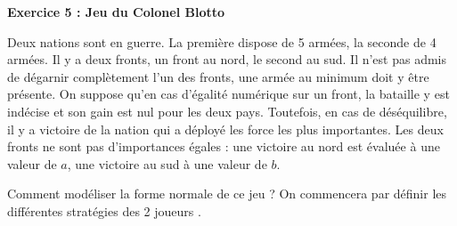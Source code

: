 \documentclass[12pt]{article}
\begin{document}
\begin{center}
\textbf{Exercice 5 : Jeu du Colonel Blotto}
\end{center}

Deux nations sont en guerre. La premi\`ere dispose de 5 arm\'ees, la seconde de 4 arm\'ees. Il y a deux fronts, un front au nord, le second au sud. 
Il n'est pas admis de d\'egarnir compl\`etement l'un des fronts, une arm\'ee au minimum doit y \^etre pr\'esente. On suppose qu'en cas d'\'egalit\'e num\'erique sur un front, 
la bataille y est ind\'ecise et son gain est nul pour les deux pays. Toutefois, en cas de d\'es\'equilibre, il y a victoire de la nation qui a d\'eploy\'e les force les plus importantes.
Les deux fronts ne sont pas d'importances \'egales : une victoire au nord est \'evalu\'ee \`a une valeur de $a$, une victoire au sud \`a une valeur de $b$.


Comment mod\'eliser la forme normale de ce jeu ? On commencera par d\'efinir les diff\'erentes strat\'egies des 2 \og joueurs \fg.

\medskip
\end{document}
